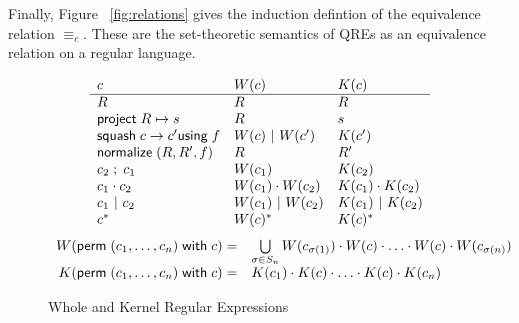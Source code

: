 \documentclass[acmsmall,review,anonymous]{acmart}\settopmatter{printfolios=true,printccs=false,printacmref=false}
\newcommand{\kw}[1]{\ensuremath{\mathsf{#1}}}
\newcommand{\project}[2]{\ensuremath{\kw{project} \; #1 \mapsto #2}}
\newcommand{\squash}[3]{\ensuremath{\kw{squash} \; #1 \rightarrow #2
\kw{using} \; #3}}
\newcommand{\perm}[2]{\ensuremath{\kw{perm}\; (#1)\; \kw{with}\; #2}}
\newcommand{\normalize}[3]{\ensuremath{\kw{normalize} \; (#1, #2, #3)}}
\newcommand{\sep}{\ensuremath{\ | \ }}
\newcommand{\eqrel}[1]{\ensuremath{\equiv_{#1}}}
\begin{document}
Finally, Figure ~\ref{fig:relations} gives the induction defintion of the
equivalence relation $\eqrel{c}$. These are the set-theoretic semantics of QREs
as an equivalence relation on a regular language.

\begin{figure}[t]
\centering
\[
\begin{array}{l@{\quad}l@{\quad}l}

c & W(c) & K(c) \\ \hline
R & R & R \\
\project{R}{s} & R & s \\
\squash{c}{c'}{f} & W(c) \sep W(c') & K(c') \\
\normalize{R}{R'}{f} & R & R' \\
c_2 \; ; \; c_1 & W(c_1) & K(c_2) \\
c_1 \cdot c_2 & W(c_1) \cdot W(c_2) & K(c_1) \cdot K(c_2) \\
c_1 \sep c_2 & W(c_1) \sep W(c_2) & K(c_1) \sep K(c_2) \\
c^* & W(c)^* & K(c)^* \\
\end{array}
\]
\[
\begin{array}{r@{\quad}l}
W( \perm{c_1, \ldots, c_n}{c} ) = &
\bigcup \limits_{\sigma \in S_n} W(c_{\sigma(1)}) \cdot W(c) \cdot \ldots \cdot
W(c) \cdot W(c_{\sigma(n)})\\
K( \perm{c_1, \ldots, c_n}{c} ) = & K(c_1) \cdot K(c) \cdot \ldots \cdot K(c)
\cdot K(c_n)
\end{array}
\]
\caption{Whole and Kernel Regular Expressions}
\label{fig:wk}
\end{figure}
\end{document}
